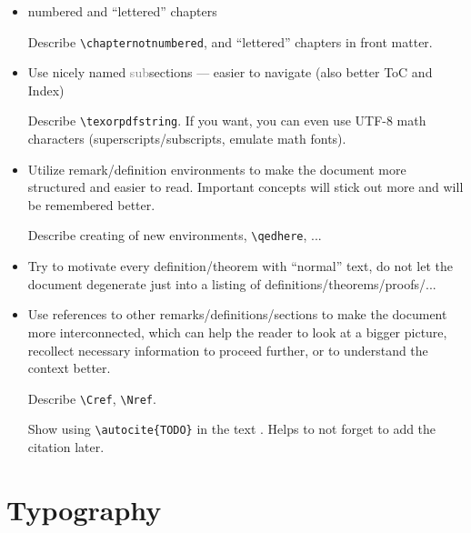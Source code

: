 \begin{itemize}
    \item numbered and \enquote{lettered} chapters
          \begin{Todo}
              Describe \verb|\chapternotnumbered|, and \enquote{lettered} chapters in front matter.
          \end{Todo}
    \item Use nicely named \textcolor{gray}{sub}sections --- easier to navigate (also better ToC and Index)
          \begin{Todo}
              Describe \verb|\texorpdfstring|.
              If you want, you can even use UTF-8 math characters (superscripts/subscripts, emulate math fonts).
          \end{Todo}
    \item Utilize remark/definition environments to make the document more structured and easier to read.
          Important concepts will stick out more and will be remembered better.
          \begin{Todo}
              Describe creating of new environments, \verb|\qedhere|, ...
          \end{Todo}
    \item Try to motivate every definition/theorem with \enquote{normal} text, do not let the document degenerate just into a listing of definitions/theorems/proofs/...
    \item Use references to other remarks/definitions/sections to make the document more interconnected, which can help the reader to look at a bigger picture, recollect necessary information to proceed further, or to understand the context better.
          \begin{Todo}
              Describe \verb|\Cref|, \verb|\Nref|.
          \end{Todo}
          \begin{Todo}
              Show using \verb|\autocite{TODO}| in the text \autocite{TODO}.
              Helps to not forget to add the citation later.
          \end{Todo}
\end{itemize}


\section{Typography}%
\label{sec:Typography}

